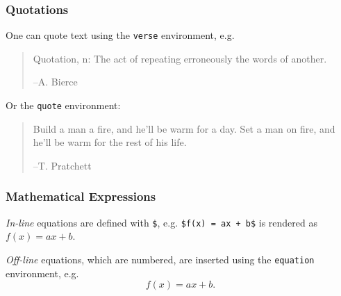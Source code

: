 \documentclass[10pt,    %
    english,            %
    xcolor=table,       %
    envcountsect,        %
    aspectratio=169     %
]{beamer}
\begin{document}
\begin{frame}
    \frametitle{Quotations}
    
    One can quote text using the \texttt{verse} environment, e.g.
    \begin{verse}
        Quotation, n: The act of repeating erroneously the words of another. \\ 
        \vspace{-0.5cm}
        \begin{flushright}--A. Bierce\end{flushright}
    \end{verse}
    
    Or the \texttt{quote} environment:
    \begin{quote}
        Build a man a fire, and he'll be warm for a day. Set a man on fire, and he'll be warm for the rest of his life. \\ 
        \begin{flushright}--T. Pratchett\end{flushright}
    \end{quote}
\end{frame}
    
\begin{frame}
    \frametitle{Mathematical Expressions} 
    
    \textit{In-line} equations are defined with \texttt{\$}, e.g. \texttt{\$f(x) = ax + b\$} is rendered as $f(x)=ax + b$.
    
    \vspace{0.25cm}
    \textit{Off-line} equations, which are numbered, are inserted using the \texttt{equation} environment, e.g.
    \begin{equation}
        \label{equ:affine}
        f(x) = ax + b.
    \end{equation}
\end{frame}




\end{document}
